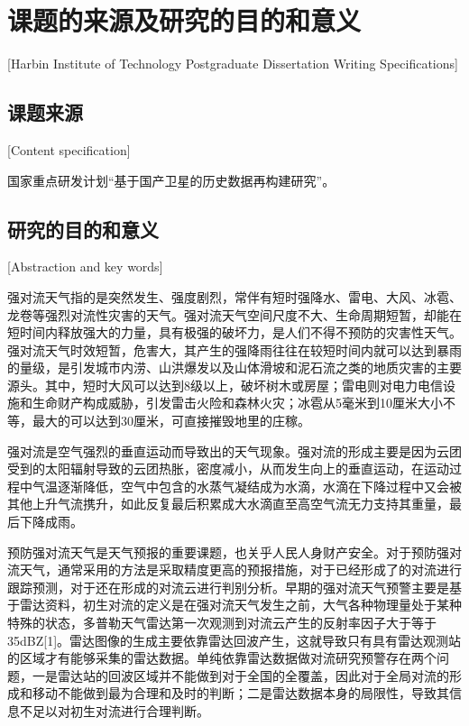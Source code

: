 
\chapter[课题的来源及研究的目的和意义]{课题的来源及研究的目的和意义}[Harbin Institute of Technology Postgraduate Dissertation Writing Specifications]


\section{课题来源}[Content specification]

国家重点研发计划“基于国产卫星的历史数据再构建研究”。

\section{研究的目的和意义}[Abstraction and key words]

强对流天气指的是突然发生、强度剧烈，常伴有短时强降水、雷电、大风、冰雹、龙卷等强烈对流性灾害的天气。强对流天气空间尺度不大、生命周期短暂，却能在短时间内释放强大的力量，具有极强的破坏力，是人们不得不预防的灾害性天气。强对流天气时效短暂，危害大，其产生的强降雨往往在较短时间内就可以达到暴雨的量级，是引发城市内涝、山洪爆发以及山体滑坡和泥石流之类的地质灾害的主要源头。其中，短时大风可以达到8级以上，破坏树木或房屋；雷电则对电力电信设施和生命财产构成威胁，引发雷击火险和森林火灾；冰雹从5毫米到10厘米大小不等，最大的可以达到30厘米，可直接摧毁地里的庄稼。

强对流是空气强烈的垂直运动而导致出的天气现象。强对流的形成主要是因为云团受到的太阳辐射导致的云团热胀，密度减小，从而发生向上的垂直运动，在运动过程中气温逐渐降低，空气中包含的水蒸气凝结成为水滴，水滴在下降过程中又会被其他上升气流携升，如此反复最后积累成大水滴直至高空气流无力支持其重量，最后下降成雨。

预防强对流天气是天气预报的重要课题，也关乎人民人身财产安全。对于预防强对流天气，通常采用的方法是采取精度更高的预报措施，对于已经形成了的对流进行跟踪预测，对于还在形成的对流云进行判别分析。早期的强对流天气预警主要是基于雷达资料，初生对流的定义是在强对流天气发生之前，大气各种物理量处于某种特殊的状态，多普勒天气雷达第一次观测到对流云产生的反射率因子大于等于35dBZ[1]。雷达图像的生成主要依靠雷达回波产生，这就导致只有具有雷达观测站的区域才有能够采集的雷达数据。单纯依靠雷达数据做对流研究预警存在两个问题，一是雷达站的回波区域并不能做到对于全国的全覆盖，因此对于全局对流的形成和移动不能做到最为合理和及时的判断；二是雷达数据本身的局限性，导致其信息不足以对初生对流进行合理判断。


